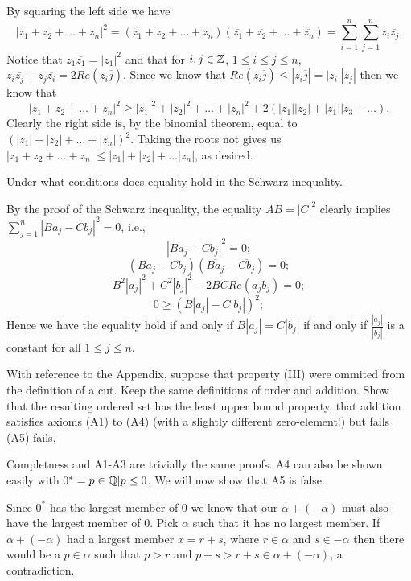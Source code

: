 \begin{solution}
  By squaring the left side we have \[|z_1 + z_2 + \ldots + z_n|^2 = (z_1 + z_2 + \ldots + z_n)(\overline{z_1} + \overline{z_2} + \ldots + \overline{z_n}) = \sum_{i = 1}^{n} \sum_{j = 1}^{n} z_i\overline{z_j}.\]
  Notice that $z_1\overline{z_1} = |z_1|^2$ and that for $i, j \in \mathbb{Z}$, $1 \le i \le j \le n$, $z_i\overline{z_j} + z_j\overline{z_i} = 2Re(z_i\overline{j})$.
  Since we know that $Re(z_i\overline{j}) \le |z_i\overline{j}| = |z_i||z_j|$ then we know that \[|z_1 + z_2 + \ldots + z_n|^2 \ge |z_1|^2 + |z_2|^2 + \ldots + |z_n|^2 + 2(|z_1||z_2| + |z_1||z_3 + \ldots).\]
  Clearly the right side is, by the binomial theorem, equal to $(|z_1| + |z_2| + \ldots + |z_n|)^2$.
  Taking the roots not gives us $|z_1 + z_2 + \ldots + z_n| \le |z_1| + |z_2| + \ldots |z_n|$, as desired.
\end{solution}

\setcounter{problem}{14}
\begin{problem}
  Under what conditions does equality hold in the Schwarz inequality.
\end{problem}

\begin{solution}
  By the proof of the Schwarz inequality, the equality $AB = |C|^2$ clearly implies $\sum_{j = 1}^{n} |Ba_j - Cb_j|^2 = 0$, i.e.,
  \[|Ba_j - Cb_j|^2 = 0;\]
  \[(Ba_j - Cb_j)(\overline{Ba_j} - \overline{Cb_j}) = 0;\]
  \[B^2|a_j|^2 + C^2|b_j|^2 - 2BCRe(a_jb_j) = 0;\]
  \[0 \ge (B|a_j| - C|b_j|)^2;\]
  Hence we have the equality hold if and only if $B|a_j| = C|b_j|$ if and only if $\frac{|a_j|}{|b_j|}$ is a constant for all $1 \le j \le n$.
\end{solution}

\setcounter{problem}{19}
\begin{problem}
  With reference to the Appendix, suppose that property (III) were ommited from the definition of a cut.
  Keep the same definitions of order and addition.
  Show that the resulting ordered set has the least upper bound property, that addition satisfies axioms (A1) to (A4) (with a slightly different zero-element!) but fails (A5) fails.
\end{problem}

\begin{solution}
  Completness and A1-A3 are trivially the same proofs.
  A4 can also be shown easily with $0^* = {p \in \mathbb{Q} | p \le 0}$.
  We will now show that A5 is false.

  Since $0^*$ has the largest member of 0 we know that our $\alpha + (-\alpha)$ must also have the largest member of $0$.
  Pick $\alpha$ such that it has no largest member.
  If $\alpha + (-\alpha)$ had a largest member $x = r + s$, where $r \in \alpha$ and $s \in -\alpha$ then there would be a $p \in \alpha$ such that $p > r$ and $p + s > r + s \in \alpha + (-\alpha)$, a contradiction.
\end{solution}
